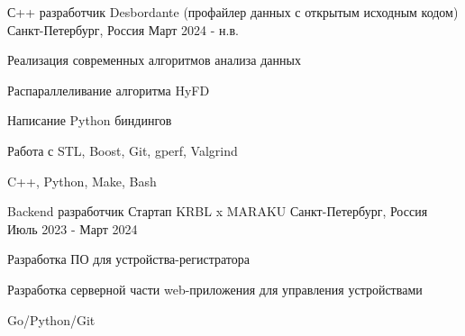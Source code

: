 

\begin{cventries}

  \cventry
    {С++ разработчик} %
    {Desbordante (профайлер данных с открытым исходным кодом)} %
    {Санкт-Петербург, Россия} %
    {Март 2024 - н.в.} %
    {
      \begin{cvitems} %
        \item {Реализация современных алгоритмов анализа данных}
        \item {Распараллеливание алгоритма HyFD}
        \item {Написание Python биндингов}
        \item {Работа с STL, Boost, Git, gperf, Valgrind}
        \item {C++, Python, Make, Bash}
      \end{cvitems}
    }

  \cventry
    {Backend разработчик} %
    {Стартап KRBL x MARAKU} %
    {Санкт-Петербург, Россия} %
    {Июль 2023 - Март 2024} %
    {
      \begin{cvitems} %
        \item {Разработка ПО для устройства-регистратора}
        \item {Разработка серверной части web-приложения для управления устройствами}
        \item {Go/Python/Git}
      \end{cvitems}
    }

\end{cventries}
